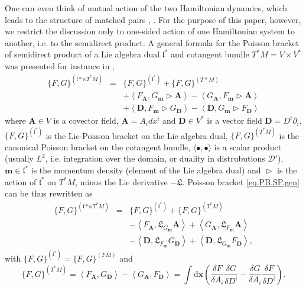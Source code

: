 \documentclass[
10pt, %
a4paper, %
oneside, %
headinclude,footinclude, %
BCOR5mm, %
]{scrartcl}
\newcommand{\xx}{\mathbf{x}}
\newcommand{\dx}{\mathrm{d}\xx}
\newcommand{\mm}{\mathbf{m}}
\renewcommand{\AA}{\mathbf{A}}
\newcommand{\DD}{\mathbf{D}}
\newcommand{\Lie}{\mathfrak{L}}
\newcommand{\LA}{\mathfrak{l}}
\begin{document}
One can even think of mutual action of the two Hamiltonian dynamics, which leads to the structure of matched pairs \cite{esen2016hamiltonian}, \cite{elmag}. For the purpose of this paper, however, we restrict the discussion only to one-sided action of one Hamiltonian system to another, i.e. to the semidirect product. A general formula for the Poisson bracket of semidirect product of a Lie algebra dual $\LA^*$ and cotangent bundle $T^*M = V\times V^*$ was presented for instance in \cite{elmag, Ogul-matched2},
\begin{eqnarray}\label{eq.PB.SP.gen}
	\{F,G\}^{(\LA*\ltimes T^*M)} &=& \{F,G\}^{(\LA^*)} + \{F,G\}^{(T*M)}\nonumber\\
	&&+\left\langle  F_\AA,G_\mm \vartriangleright \AA\right\rangle
	-\left\langle  G_\AA,F_\mm \vartriangleright \AA\right\rangle\nonumber\\
	&&+ \left\langle \DD, F_\mm\vartriangleright  G_\DD\right\rangle
	- \left\langle \DD, G_\mm\vartriangleright  F_\DD\right\rangle
\end{eqnarray}
where $\AA\in V$ is a covector field, $\AA = A_i dx^i$ and $\DD\in V^*$ is a vector field $\DD = D^i \partial_i$, $\{F,G\}^{(\LA^*)}$ is the Lie-Poisson bracket on the Lie algebra dual, $\{F,G\}^{(T^*M)}$ is the canonical Poisson bracket on the cotangent bundle, $\langle\bullet,\bullet\rangle$ is a scalar product (usually $L^2$, i.e. integration over the domain, or duality in distrubutions $\mathcal{D}'$), $\mm\in\LA^*$ is the momentum density (element of the Lie algebra dual) and $\vartriangleright$ is the action of $\LA^*$ on $T^*M$,  minus the Lie derivative $- \Lie$. Poisson bracket \eqref{eq.PB.SP.gen} can be thus rewritten as
\begin{eqnarray}
	\{F,G\}^{(\LA*\ltimes T^*M)} &=& \{F,G\}^{(\LA^*)} + \{F,G\}^{(T^*M)}\nonumber\\
	&&-\left\langle  F_\AA, \Lie_{G_\mm} \AA\right\rangle
	+\left\langle  G_\AA, \Lie_{F_\mm} \AA\right\rangle\nonumber\\
	&&- \left\langle \DD, \Lie_{F_\mm}  G_\DD\right\rangle
	+ \left\langle \DD, \Lie_{G_\mm} F_\DD\right\rangle,
\end{eqnarray}
 with $\{F,G\}^{(\LA^*)} = \{F,G\}^{(FM)}$ and 
 \begin{equation}
 \{F,G\}^{(T^*M)} = \left\langle F_\AA, G_\DD\right\rangle -\left\langle G_\AA, F_\DD\right\rangle 
 = \int\dx \left(\frac{\delta F}{\delta A_i}\frac{\delta G}{\delta D^i}-\frac{\delta G}{\delta A_i}\frac{\delta F}{\delta D^i}\right).
 \end{equation}
\end{document}
